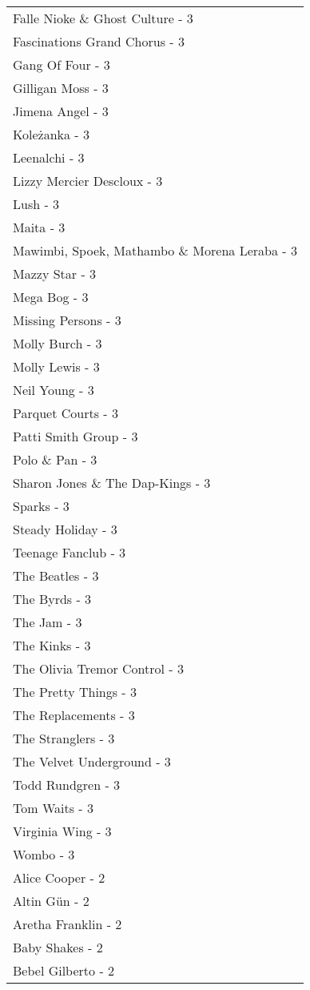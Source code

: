 \documentclass[
]{article}
\begin{document}
\begin{longtable}{l}
Falle Nioke \& Ghost Culture - 3 \\ 
Fascinations Grand Chorus - 3 \\ 
Gang Of Four - 3 \\ 
Gilligan Moss - 3 \\ 
Jimena Angel - 3 \\ 
Koleżanka - 3 \\ 
Leenalchi - 3 \\ 
Lizzy Mercier Descloux - 3 \\ 
Lush - 3 \\ 
Maita - 3 \\ 
Mawimbi, Spoek, Mathambo \& Morena Leraba - 3 \\ 
Mazzy Star - 3 \\ 
Mega Bog - 3 \\ 
Missing Persons - 3 \\ 
Molly Burch - 3 \\ 
Molly Lewis - 3 \\ 
Neil Young - 3 \\ 
Parquet Courts - 3 \\ 
Patti Smith Group - 3 \\ 
Polo \& Pan - 3 \\ 
Sharon Jones \& The Dap-Kings - 3 \\ 
Sparks - 3 \\ 
Steady Holiday - 3 \\ 
Teenage Fanclub - 3 \\ 
The Beatles - 3 \\ 
The Byrds - 3 \\ 
The Jam - 3 \\ 
The Kinks - 3 \\ 
The Olivia Tremor Control - 3 \\ 
The Pretty Things - 3 \\ 
The Replacements - 3 \\ 
The Stranglers - 3 \\ 
The Velvet Underground - 3 \\ 
Todd Rundgren - 3 \\ 
Tom Waits - 3 \\ 
Virginia Wing - 3 \\ 
Wombo - 3 \\ 
Alice Cooper - 2 \\ 
Altin Gün - 2 \\ 
Aretha Franklin - 2 \\ 
Baby Shakes - 2 \\ 
Bebel Gilberto - 2 \\ 

\end{longtable}
\end{document}
